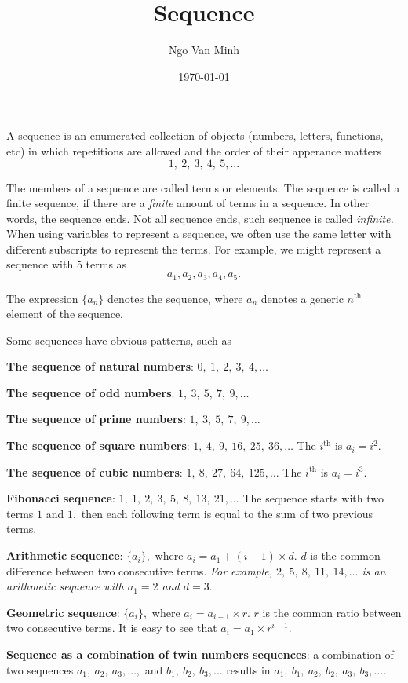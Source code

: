 \documentclass{article}
\title{Sequence}
\author{Ngo Van Minh}
\date{\today}
\begin{document}
\maketitle

A sequence is an enumerated collection of objects (numbers, letters, functions, etc) in which repetitions are allowed and the order of their apperance matters
\[
    1,\ 2,\ 3,\ 4,\ 5, ...
\]

The members of a sequence are called terms or elements.
The sequence is called a finite sequence, if there are a \textit{finite} amount of terms in a sequence. 
In other words, the sequence ends. Not all sequence ends, such sequence is called \textit{infinite.}
When using variables to represent a sequence,
we often use the same letter with different subscripts to represent the terms.
For example, we might represent a sequence with $5$ terms as 
\[ 
    a_1, a_2, a_3, a_4, a_5.
\]

The expression $\{a_n\}$ denotes the sequence,
where $a_n$ denotes a generic $n^{\text{th}}$ element of the sequence.

Some sequences have obvious patterns, such as

\textbf{The sequence of natural numbers}: $0,\ 1,\ 2,\ 3,\ 4, \ldots$

\textbf{The sequence of odd numbers}: $1,\ 3,\ 5,\ 7,\ 9, \ldots$

\textbf{The sequence of prime numbers}: $1,\ 3,\ 5,\ 7,\ 9, \ldots$

\textbf{The sequence of square numbers}: $1,\ 4,\ 9,\ 16,\ 25,\ 36, \ldots$ The $i^{\text{th}}$ is $a_i = i^2.$

\textbf{The sequence of cubic numbers}: $1,\ 8,\ 27,\ 64,\ 125, \ldots$ The $i^{\text{th}}$ is $a_i = i^3.$

\textbf{Fibonacci sequence}: $1,\ 1,\ 2,\ 3,\ 5,\ 8,\ 13,\ 21, \ldots$ The sequence starts with two terms $1$ and $1,$
then each following term is equal to the sum of two previous terms.

\textbf{Arithmetic sequence}: $\{a_i\},$ where $a_i = a_1 + (i-1) \times d.$
$d$ is the common difference between two consecutive terms.
\textit{For example, $2,\ 5,\ 8,\ 11,\ 14, \ldots$ is an arithmetic sequence with $a_1 = 2$ and $d=3.$}

\textbf{Geometric sequence}: $\{a_i\},$ where $a_i = a_{i-1} \times r.$
$r$ is the common ratio between two consecutive terms.
It is easy to see that $a_i = a_1 \times r^{i-1}.$

\textbf{Sequence as a combination of twin numbers sequences}: a combination of two sequences $a_1,\ a_2,\ a_3, \ldots,$
and $b_1,\ b_2,\ b_3, \ldots$ results in $a_1,\ b_1,\ a_2,\ b_2,\ a_3,\ b_3, \ldots.$
\end{document}
